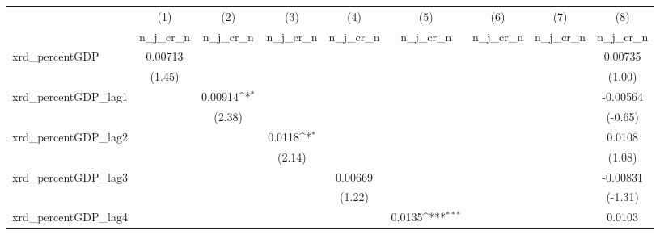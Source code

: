 {
\def\sym#1{\ifmmode^{#1}\else\(^{#1}\)\fi}
\begin{tabular}{l*{8}{c}}
\toprule
          &\multicolumn{1}{c}{(1)}&\multicolumn{1}{c}{(2)}&\multicolumn{1}{c}{(3)}&\multicolumn{1}{c}{(4)}&\multicolumn{1}{c}{(5)}&\multicolumn{1}{c}{(6)}&\multicolumn{1}{c}{(7)}&\multicolumn{1}{c}{(8)}\\
          &\multicolumn{1}{c}{n\_j\_cr\_n}&\multicolumn{1}{c}{n\_j\_cr\_n}&\multicolumn{1}{c}{n\_j\_cr\_n}&\multicolumn{1}{c}{n\_j\_cr\_n}&\multicolumn{1}{c}{n\_j\_cr\_n}&\multicolumn{1}{c}{n\_j\_cr\_n}&\multicolumn{1}{c}{n\_j\_cr\_n}&\multicolumn{1}{c}{n\_j\_cr\_n}\\
\midrule
xrd\_percentGDP&  0.00713         &                  &                  &                  &                  &                  &                  &  0.00735         \\
          &   (1.45)         &                  &                  &                  &                  &                  &                  &   (1.00)         \\
\addlinespace
xrd\_percentGDP\_lag1&                  &  0.00914\sym{*}  &                  &                  &                  &                  &                  & -0.00564         \\
          &                  &   (2.38)         &                  &                  &                  &                  &                  &  (-0.65)         \\
\addlinespace
xrd\_percentGDP\_lag2&                  &                  &   0.0118\sym{*}  &                  &                  &                  &                  &   0.0108         \\
          &                  &                  &   (2.14)         &                  &                  &                  &                  &   (1.08)         \\
\addlinespace
xrd\_percentGDP\_lag3&                  &                  &                  &  0.00669         &                  &                  &                  & -0.00831         \\
          &                  &                  &                  &   (1.22)         &                  &                  &                  &  (-1.31)         \\
\addlinespace
xrd\_percentGDP\_lag4&                  &                  &                  &                  &   0.0135\sym{***}&                  &                  &   0.0103         \\

\end{tabular}}
